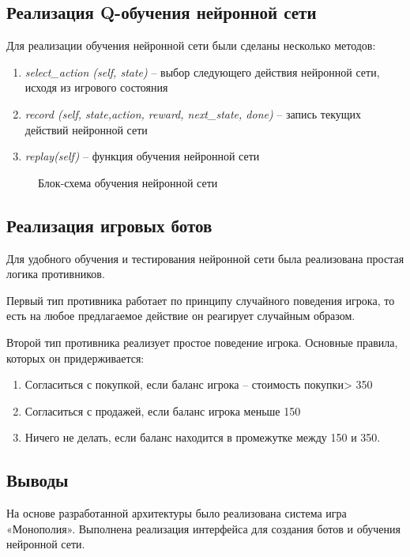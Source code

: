 \subsection{Реализация Q-обучения нейронной сети}
Для реализации обучения нейронной сети были сделаны несколько методов:
\begin{enumerate}
    \item \textit{select\_action (self, state)} – выбор следующего действия нейронной сети, исходя из игрового состояния
    \item \textit{record (self, state,action, reward, next\_state, done)} – запись текущих действий нейронной сети
    \item \textit{replay(self)} – функция обучения нейронной сети
\end{enumerate}
\begin{figure}[h!]
    \caption{Блок-схема обучения нейронной сети}
\end{figure}
\newpage
\subsection{Реализация игровых ботов}
Для удобного обучения и тестирования нейронной сети была реализована простая логика противников. 

Первый тип противника работает по принципу случайного поведения игрока, то есть на любое предлагаемое действие он реагирует случайным образом.

Второй тип противника реализует простое поведение игрока. Основные правила, которых он придерживается:
\begin{enumerate}
    \item Согласиться с покупкой, если баланс игрока – стоимость покупки> 350
    \item Согласиться с продажей, если баланс игрока меньше 150
    \item Ничего не делать, если баланс находится в промежутке между 150 и 350.
\end{enumerate}
\subsection*{Выводы}
На основе разработанной архитектуры было реализована система игра «Монополия». Выполнена реализация интерфейса для создания ботов и обучения нейронной сети.